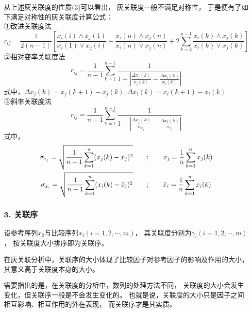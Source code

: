从上述灰关联度的性质(3)可以看出，
灰关联度一般不满足对称性，
于是便有了如下满足对称性的灰关联度计算公式：\\
①改进关联度法
\begin{equation}
r_{ij}=\frac{1}{2(n-1)} \left[
\frac{x_i(i)\wedge x_j(1)}{x_i(1) \vee x_j(i)}+
\frac{x_i(n)\wedge x_j(n)}{x_i(n) \vee x_j(n)}+
2\sum_{k=2}^{n-1}\frac{x_i(k)\wedge x_j(k)}{x_i(k)\vee x_j(k)}
\right]
\end{equation}
②相对变率关联度法
\begin{equation}
r_{ij}=\frac{1}{n-1}\sum_{k=1}^{n-1} \frac{1}{1+|
\frac{\Delta x_j(k)}{x_j(k)}-\frac{\Delta x_i(k)}{x_i(k)}|}
\end{equation}
式中，$\Delta x_j(k)=x_j(k+1)-x_j(k), \Delta x_i(k)=x_i(k+1)-x_i(k)$ \\
③斜率关联度法
\begin{equation}
r_{ij}=\frac{1}{n-1}\sum_{k=1}^{n-1} \frac{1}{1+|
\frac{\Delta x_j(k)}{\sigma_{x_j}}-\frac{\Delta x_i(k)}{\sigma_{x_i}}|}
\end{equation}
式中，
\begin{gather}
\sigma_{x_j}=\sqrt{\frac{1}{n-1}\sum_{k=1}^{n}(x_j(k)-\bar{x}_j)^2}
\qquad ; \qquad \bar{x}_j=\frac{1}{n} \sum_{k=1}^{n} x_j(k)  \notag \\
\sigma_{x_i}=\sqrt{\frac{1}{n-1}\sum_{k=1}^{n}(x_i(k)-\bar{x}_i)^2}
\qquad ; \qquad \bar{x}_i=\frac{1}{n} \sum_{k=1}^{n} x_i(k)  \notag 
\end{gather}
   
\subsubsection*{3. 关联序}
设参考序列$x_0$与比较序列$x_i (i=1,2,\cdots,m)$，
其关联度分别为$\gamma_i(i=1,2,\cdots,m)$ ，
按关联度大小排序即为关联序。

在灰关联分析中，关联序的大小体现了比较因子对参考因子的影响及作用的大小，
其意义高于关联度本身的大小。

需要指出的是，在关联度的分析中，数列的处理方法不同，
关联度的大小会发生变化，但关联序一般是不会发生变化的。
也就是说，关联度的大小只是因子之间相互影响、相互作用的外在表现，
而关联序才是其实质。

